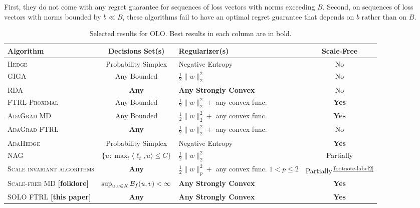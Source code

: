 First, they do not come with any regret guarantee for sequences of loss vectors
with norms exceeding $B$. Second, on sequences of loss vectors with norms
bounded by $b \ll B$, these algorithms fail to have an optimal regret guarantee
that depends on $b$ rather than on $B$.

\renewcommand{\arraystretch}{1.8}

\begin{table}[t]
\fontsize{8}{8.2}\selectfont
\centering
\begin{tabular}{|p{3.6cm}|c|p{3.4cm}|c|}
\hline
\textbf{Algorithm} & \textbf{Decisions Set(s)} & \textbf{Regularizer(s)} & \textbf{Scale-Free} \\ \hline \hline
\textsc{Hedge} \cite{Freund-Schapire-1997} & Probability Simplex & Negative Entropy & No \\ \hline
\textsc{GIGA} \cite{Zinkevich-2003} & Any Bounded & $\frac{1}{2}\|w\|_2^2$ & No \\ \hline
\textsc{RDA} \cite{Xiao-2010} & \textbf{Any} & \textbf{Any Strongly Convex} & No \\ \hline
\textsc{FTRL-Proximal} \cite{McMahan-Streeter-2010,McMahan-2014} & Any Bounded & $\frac{1}{2}\|w\|_2^2 + $ any convex func.\footnotemark & \textbf{Yes} \\ \hline
\textsc{AdaGrad MD} \cite{Duchi-Hazan-Singer-2011} & Any Bounded & $\frac{1}{2}\|w\|_2^2 + $ any convex func. & \textbf{Yes} \\ \hline
\textsc{AdaGrad FTRL} \cite{Duchi-Hazan-Singer-2011} & \textbf{Any} & $\frac{1}{2}\|w\|_2^2 + $ any convex func. & No \\ \hline
\textsc{AdaHedge} \cite{de-Rooij-van-Erven-Grunwald-Koolen-2014} & Probability Simplex & Negative Entropy & \textbf{Yes} \\ \hline
\textsc{NAG} \cite{Ross-Mineiro-Langford-2013} & $\{u: \max_t \langle \ell_t, u\rangle \le C\}$ & $\frac{1}{2}\|w\|_2^2 $& Partially\footnotemark \\ \hline
\textsc{Scale invariant algorithms} \cite{Orabona-Crammer-Cesa-Bianchi-2014} & \textbf{Any} & $\frac{1}{2}\|w\|_p^2 + $ any convex func. \newline $1 < p \le 2$ & Partially\textsuperscript{\ref{footnote-label2}} \\ \hline
\textsc{Scale-free MD} \textbf{[folklore]} & $\sup_{u,v \in K} \mathcal{B}_f(u,v) < \infty$ & \textbf{Any Strongly Convex} & \textbf{Yes} \\ \hline
\textsc{SOLO FTRL} \textbf{[this paper]} & \textbf{Any} & \textbf{Any Strongly Convex} & \textbf{Yes} \\ \hline
\end{tabular}
\caption{Selected results for OLO. Best results in each column are in bold.
\label{table:results}
}
\end{table}

